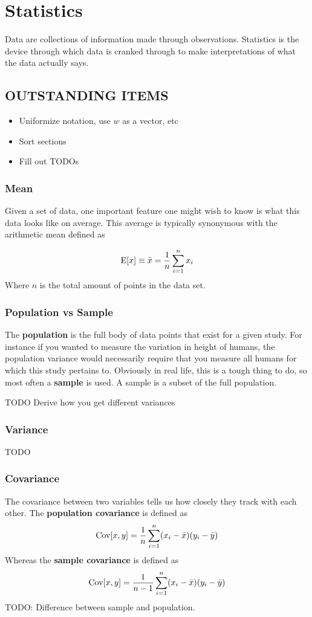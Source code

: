 \chapter{Statistics}
Data are collections of information made through observations. Statistics is the device through which data is cranked through to make interpretations of what the data actually says.

\section{OUTSTANDING ITEMS}
\begin{itemize}
	\item Uniformize notation, use $w$ as a vector, etc
	\item Sort sections
	\item Fill out TODOs
\end{itemize}

\subsection{Mean}
Given a set of data, one important feature one might wish to know is what this data looks like on average. This average is typically synonymous with the arithmetic mean defined as 

\begin{align}
\mathrm{E}[x] \equiv \bar{x} = \frac{1}{n}\sum_{i=1}^n x_i
\end{align}
Where $n$ is the total amount of points in the data set.
\subsection{Population vs Sample}
The \textbf{population} is the full body of data points that exist for a given study. For instance if you wanted to measure the variation in height of humans, the population variance would necessarily require that you measure all humans for which this study pertains to. Obviously in real life, this is a tough thing to do, so most often a \textbf{sample} is used. A sample is a subset of the full population.

TODO Derive how you get different variances

\subsection{Variance}
TODO
\subsection{Covariance}
The covariance between two variables tells us how closely they track with each other. The \textbf{population covariance} is defined as 
\begin{align}
\mathrm{Cov}[x,y] = \frac{1}{n}\sum_{i=1}^n (x_i-\bar{x})(y_i-\bar{y})
\end{align}
Whereas the \textbf{sample covariance} is defined as 
\begin{align}
	\mathrm{Cov}[x,y] = \frac{1}{n-1}\sum_{i=1}^n (x_i-\bar{x})(y_i-\bar{y})
\end{align}
TODO: Difference between sample and population.


